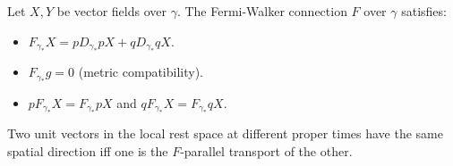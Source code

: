 Let $X, Y$ be vector fields over $\gamma$. The Fermi-Walker connection $F$ over $\gamma$ satisfies:
\begin{itemize}
  \item[(a)] $F_{\gamma_*} X = p D_{\gamma_*} pX + q D_{\gamma_*} qX$.
  \item[(b)] $F_{\gamma_*} g = 0$ (metric compatibility).
  \item[(c)] $p F_{\gamma_*} X = F_{\gamma_*} pX$ and $q F_{\gamma_*} X = F_{\gamma_*} qX$.
\end{itemize}
Two unit vectors in the local rest space at different proper times have the same spatial direction iff one is the $F$-parallel transport of the other.
